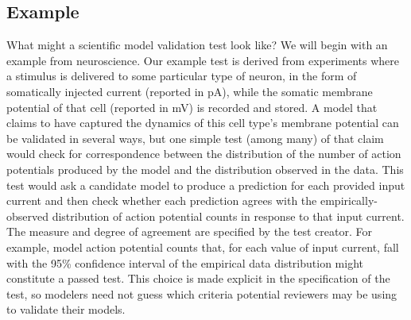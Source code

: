 \documentclass[11pt,letterpaper]{article}
\begin{document}
\subsection{Example} What might a scientific model validation test look like?  We will begin with an example from neuroscience. Our example test is derived from experiments where a stimulus is delivered to some particular type of neuron, in the form of somatically injected current (reported in pA), while the somatic membrane potential of that cell (reported in mV) is recorded and stored.  A model that claims to have captured the dynamics of this cell type's membrane potential can be validated in several ways, but one simple test (among many) of that claim would check for correspondence between the distribution of the number of action potentials produced by the model and the distribution observed in the data. This test would ask a candidate model to produce a prediction for each provided input current and then check whether each prediction agrees with the empirically-observed distribution of action potential counts in response to that input current.  The measure and degree of agreement are specified by the test creator.  For example, model action potential counts that, for each value of input current, fall with the 95\% confidence interval of the empirical data distribution might constitute a passed test. This choice is made explicit in the specification of the test, so modelers need not guess which criteria potential reviewers may be using to validate their models.
\end{document}
